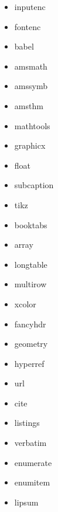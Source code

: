 \documentclass[12pt,a4paper]{article}
\begin{document}
\begin{multicols}{2}
\begin{itemize}
    \item inputenc
    \item fontenc
    \item babel
    \item amsmath
    \item amssymb
    \item amsthm
    \item mathtools
    \item graphicx
    \item float
    \item subcaption
    \item tikz
    \item booktabs
    \item array
    \item longtable
    \item multirow
    \item xcolor
    \item fancyhdr
    \item geometry
    \item hyperref
    \item url
    \item cite
    \item listings
    \item verbatim
    \item enumerate
    \item enumitem
    \item lipsum
\end{itemize}
\end{multicols}
\end{document}
